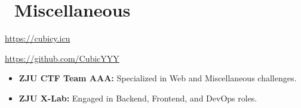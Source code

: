 \documentclass{resume}
\begin{document}
\section{\faInfo\ Miscellaneous}
\begin{description}[parsep=0.5ex]
  \item[Personal Blog] \url{https://cubicy.icu}
  \item[GitHub] \url{https://github.com/CubicYYY}
  \item[Team Involvement]
  \begin{itemize}
    \item \textbf{ZJU CTF Team AAA:} Specialized in Web and Miscellaneous challenges.
    \item \textbf{ZJU X-Lab:} Engaged in Backend, Frontend, and DevOps roles.
  \end{itemize}
\end{description}

%
%
\end{document}
